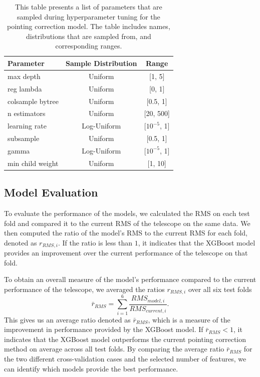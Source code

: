 \begin{table}[H]
    \centering
    \caption{This table presents a list of parameters that are sampled during hyperparameter tuning for the pointing correction model. The table includes names, distributions that are sampled from, and corresponding ranges.}
    \begin{tabular}{lcc}
        \hline
        \textbf{Parameter} & \textbf{Sample Distribution} & \textbf{Range} \\ \hline
        max depth & Uniform & [1, 5] \\ 
        reg lambda & Uniform & [0, 1] \\ 
        colsample bytree & Uniform & [0.5, 1] \\ 
        n estimators & Uniform & [20, 500] \\ 
        learning rate & Log-Uniform & [$10^{-5}$, 1] \\ 
        subsample & Uniform & [0.5, 1] \\ 
        gamma & Log-Uniform & [$10^{-5}$, 1] \\ 
        min child weight & Uniform & [1, 10] \\ 
    \end{tabular}
    \label{tab:xgb_hyperparameters_pcorr}
\end{table}



\subsection{Model Evaluation}
To evaluate the performance of the models, we calculated the RMS on each test fold and compared it to the current RMS of the telescope on the same data.
We then computed the ratio of the model's RMS to the current RMS for each fold, denoted as $r_{RMS,i}$.
If the ratio is less than $1$, it indicates that the XGBoost model provides an improvement over the current performance of the telescope on that fold.

To obtain an overall measure of the model's performance compared to the current performance of the telescope, we averaged the ratios $r_{RMS,i}$ over all six test folds
\begin{equation}
    \bar{r}_{RMS} = \sum_{i=1}^6 \frac{RMS_{model,i}}{RMS_{current,i}}.
\end{equation}
This gives us an average ratio denoted as $\bar{r}_{RMS}$, which is a measure of the improvement in performance provided by the XGBoost model.
If $\bar{r}_{RMS} < 1$, it indicates that the XGBoost model outperforms the current pointing correction method on average across all test folds.
By comparing the average ratio $\bar{r}_{RMS}$ for the two different cross-validation cases and the selected number of features, we can identify which models provide the best performance.
